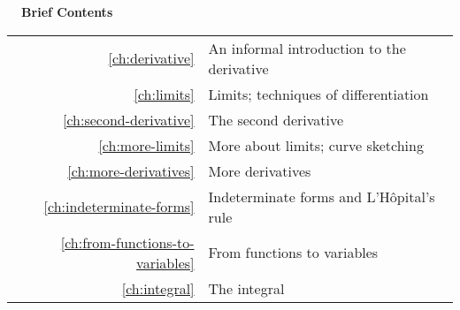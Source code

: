 \documentclass{fund}
\begin{document}
%

\cleardoublepage





\pagebreak\vspace{100mm}

\hbox{}\noindent\huge\bfseries\sffamily{}\hspace{-2mm}\ \ Brief Contents\\
\hspace{-20mm}\noindent\mynormaltype\Large\sffamily{}\begin{tabular}{rl}
\ref{ch:derivative} & An informal introduction to the derivative \quad \pageref{ch:derivative}\\
\ref{ch:limits} &  Limits; techniques of differentiation \quad \pageref{ch:limits}\\
\ref{ch:second-derivative} & The second derivative \quad \pageref{ch:second-derivative}\\
\ref{ch:more-limits} & More about limits; curve sketching\quad \pageref{ch:more-limits}\\
\ref{ch:more-derivatives} & More derivatives\quad \pageref{ch:more-derivatives}\\
\ref{ch:indeterminate-forms} & Indeterminate forms and L'H\^{o}pital's rule 
                  \quad \pageref{ch:indeterminate-forms} \\
\ref{ch:from-functions-to-variables} & From functions to variables
                  \quad \pageref{ch:from-functions-to-variables} \\
\ref{ch:integral} & The integral
                  \quad \pageref{ch:integral} \\
\end{tabular}
\mynormaltype

\vspace{100mm}\pagebreak

\cleardoublepage

\mynormaltype

\tableofcontents

\mainmatter
  \addtocounter{page}{8} 
\parafmt
\myeqnspacing %
	\renewcommand{\chapdir}{ch01}
	\renewcommand{\chapdir}{ch02}
	\renewcommand{\chapdir}{ch03}
	\renewcommand{\chapdir}{ch04}
	\renewcommand{\chapdir}{ch05}
	\renewcommand{\chapdir}{ch06}
	\renewcommand{\chapdir}{ch07}
	\formatchtoc{\large}{\quad\contentspage}{4mm} %
	\renewcommand{\chapdir}{ch08}
\end{document}
